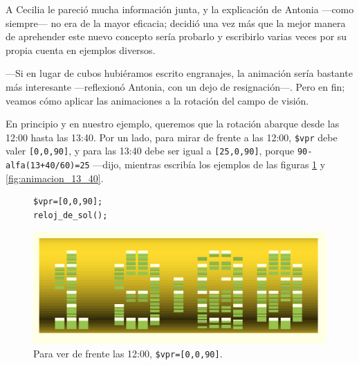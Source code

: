 A Cecilia le pareció mucha información junta, y la explicación de
Antonia ---como siempre--- no era de la mayor eficacia; decidió una
vez más que la mejor manera de aprehender este nuevo concepto sería
probarlo y escribirlo varias veces por su propia cuenta en ejemplos
diversos.

---Si en lugar de cubos hubiéramos escrito engranajes, la animación
sería bastante más interesante ---reflexionó Antonia, con un dejo de
resignación---. Pero en fin; veamos cómo aplicar las animaciones a la
rotación del campo de visión.

\guillemotright En principio y en nuestro ejemplo, queremos que la
rotación abarque desde las 12:00 hasta las 13:40. Por un lado, para
mirar de frente a las 12:00, \texttt{\$vpr} debe valer
\lstinline![0,0,90]!, y para las 13:40 debe ser igual a
\lstinline![25,0,90]!, porque \lstinline!90-alfa(13+40/60)=25!
---dijo, mientras escribía los ejemplos de las figuras
\ref{fig:animacion_12_00} y \ref{fig:animacion_13_40}.




\begin{figure}[ht]
  \begin{minipage}[]{.3\textwidth}
\begin{lstlisting}
$vpr=[0,0,90];
reloj_de_sol();
\end{lstlisting}%
  \end{minipage}\hfill
  \begin{minipage}[]{.68\textwidth}
    \centering
    \includegraphics[width=1\textwidth]{imagenes/animacion_12_00}  
  \end{minipage}
    \caption{Para ver de frente las 12:00, \texttt{\$vpr=[0,0,90]}.}
  \label{fig:animacion_12_00}
\end{figure}



